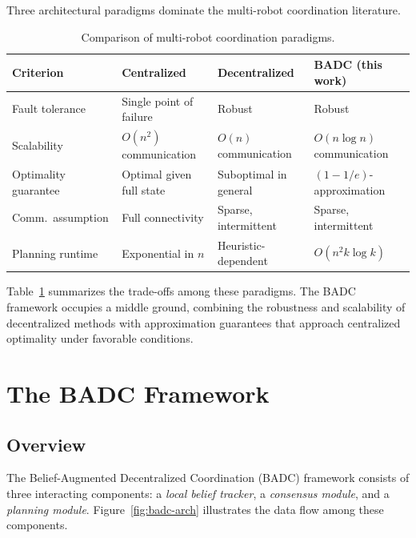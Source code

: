 \documentclass[12pt,oneside]{report}
\theoremstyle{definition}
\theoremstyle{remark}
\begin{document}
Three architectural paradigms dominate the multi-robot coordination literature.

\begin{table}[htbp]
\centering
\caption{Comparison of multi-robot coordination paradigms.}
\label{tab:paradigms}
\vspace{4pt}
\begin{tabular}{@{}p{2.5cm} p{3.2cm} p{3.2cm} p{3.2cm}@{}}
\toprule
\color{jhublue}\textbf{Criterion} &
\color{jhublue}\textbf{Centralized} &
\color{jhublue}\textbf{Decentralized} &
\color{jhublue}\textbf{BADC (this work)} \\
\midrule
Fault tolerance    & Single point of failure    & Robust                     & Robust                        \\
Scalability        & $O(n^2)$ communication      & $O(n)$ communication        & $O(n \log n)$ communication   \\
Optimality guarantee& Optimal given full state    & Suboptimal in general       & $(1-1/e)$-approximation       \\
Comm.\ assumption  & Full connectivity           & Sparse, intermittent        & Sparse, intermittent          \\
Planning runtime   & Exponential in $n$          & Heuristic-dependent         & $O(n^2 k \log k)$             \\
\bottomrule
\end{tabular}
\vspace{4pt}
\end{table}

Table~\ref{tab:paradigms} summarizes the trade-offs among these paradigms.
The BADC framework occupies a middle ground, combining the robustness and
scalability of decentralized methods with approximation guarantees that
approach centralized optimality under favorable conditions.

\chapter{The BADC Framework}
\label{ch:badc}

\section{Overview}

The Belief-Augmented Decentralized Coordination (BADC) framework consists of
three interacting components: a \textit{local belief tracker}, a
\textit{consensus module}, and a \textit{planning module}. Figure~\ref{fig:badc-arch}
illustrates the data flow among these components.
\end{document}

